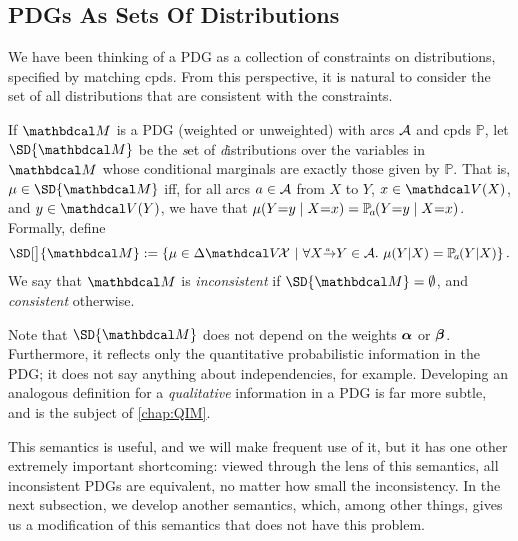\subsection{PDGs As Sets Of Distributions}\label{sec:set-of-distribution-semantics} 
We have been thinking of a PDG as a collection of constraints on distributions,
specified by matching cpds. From this perspective, it is natural to consider the
set of all distributions that are consistent with the constraints.

\begin{defn} \label{def:set-semantics} 
If $\dg M$ is a PDG (weighted or unweighted) with arcs $\mathcal A$ and
cpds $\mathbb P$, 
let $\SD{\dg M}$ be the \emph{s}et of
\emph{d}istributions over the variables in $\dg M$ 
whose conditional marginals are exactly those given by $\mathbb P$.
That is, $\mu \in \SD{\dg M}$ iff, for all arcs $a \in \mathcal A$ from $X$
to $Y$,  $x \in 
\V(X)$,  and $y \in \V(Y)$, we have that $\mu(Y{=}y\mid X{=}x) = \p_a(Y{=}y\mid X{=}x)$.
Formally, define
    \[ \SD[\big]{\dg M} :=
    \left\{\mu \in \Delta \V\!\X ~\middle|~
        \forall \ed aXY \in \Ar.~\mu(Y|X) = \p_a(Y|X)
        \right\}.
    \]
We say that
$\dg M$ is \emph{inconsistent} if $\SD{\dg M} = \emptyset$, and \emph{consistent} otherwise.
\end{defn}
Note that $\SD{\dg M}$
does not depend on the weights $\boldsymbol\alpha$ or $\boldsymbol\beta$.
Furthermore, it reflects only the quantitative probabilistic information in the PDG; it does not say anything about independencies, for example.
Developing an analogous definition for a \emph{qualitative} information in a PDG is far more subtle, and is the subject of \cref{chap:QIM}. 

This semantics is useful, and we will make frequent use of it, 
but it has one other extremely important shortcoming: viewed through the lens of this semantics, all inconsistent PDGs are equivalent, no matter how small the inconsistency.
In the next subsection, we develop another semantics, which, among other things, gives us a modification of this semantics that does not have this problem.



